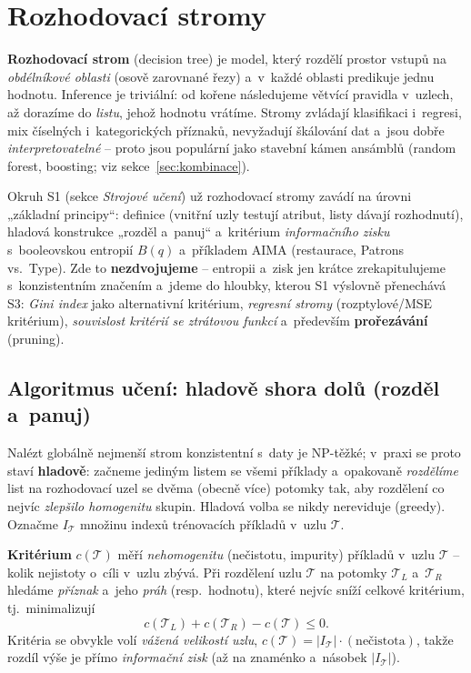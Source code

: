 \section{Rozhodovací stromy}\label{sec:stromy}

\textbf{Rozhodovací strom} (decision tree) je model, který rozdělí prostor vstupů na \emph{obdélníkové oblasti} (osově zarovnané řezy) a~v~každé oblasti predikuje jednu hodnotu. Inference je triviální: od kořene následujeme větvící pravidla v~uzlech, až dorazíme do \emph{listu}, jehož hodnotu vrátíme. Stromy zvládají klasifikaci i~regresi, mix číselných i~kategorických příznaků, nevyžadují škálování dat a~jsou dobře \emph{interpretovatelné} -- proto jsou populární jako stavební kámen ansámblů (random forest, boosting; viz sekce~\ref{sec:kombinace}).

\begin{poznamka}[Vztah k~S1]
Okruh S1 (sekce \emph{Strojové učení}) už rozhodovací stromy zavádí na úrovni „základní principy``: definice (vnitřní uzly testují atribut, listy dávají rozhodnutí), hladová konstrukce „rozděl a~panuj`` a~kritérium \emph{informačního zisku} s~booleovskou entropií $B(q)$ a~příkladem AIMA (restaurace, Patrons vs.\ Type). Zde to \textbf{nezdvojujeme} -- entropii a~zisk jen krátce zrekapitulujeme s~konzistentním značením a~jdeme do hloubky, kterou S1 výslovně přenechává S3: \emph{Gini index} jako alternativní kritérium, \emph{regresní stromy} (rozptylové/MSE kritérium), \emph{souvislost kritérií se ztrátovou funkcí} a~především \textbf{prořezávání} (pruning).
\end{poznamka}

\subsection{Algoritmus učení: hladově shora dolů (rozděl a~panuj)}

Nalézt globálně nejmenší strom konzistentní s~daty je NP-těžké; v~praxi se proto staví \textbf{hladově}: začneme jediným listem se všemi příklady a~opakovaně \emph{rozdělíme} list na rozhodovací uzel se dvěma (obecně více) potomky tak, aby rozdělení co nejvíc \emph{zlepšilo homogenitu} skupin. Hladová volba se nikdy nereviduje (greedy). Označme $I_{\mathcal{T}}$ množinu indexů trénovacích příkladů v~uzlu $\mathcal{T}$.

\begin{definice}
\textbf{Kritérium} $c(\mathcal{T})$ měří \emph{nehomogenitu} (nečistotu, impurity) příkladů v~uzlu $\mathcal{T}$ -- kolik nejistoty o~cíli v~uzlu zbývá. Při rozdělení uzlu $\mathcal{T}$ na potomky $\mathcal{T}_L$ a~$\mathcal{T}_R$ hledáme \emph{příznak} a~jeho \emph{práh} (resp.\ hodnotu), které nejvíc sníží celkové kritérium, tj.\ minimalizují
\[ c(\mathcal{T}_L) + c(\mathcal{T}_R) - c(\mathcal{T}) \le 0. \]
Kritéria se obvykle volí \emph{vážená velikostí uzlu}, $c(\mathcal{T}) = |I_{\mathcal{T}}|\cdot(\text{nečistota})$, takže rozdíl výše je přímo \emph{informační zisk} (až na znaménko a~násobek $|I_{\mathcal{T}}|$).
\end{definice}

